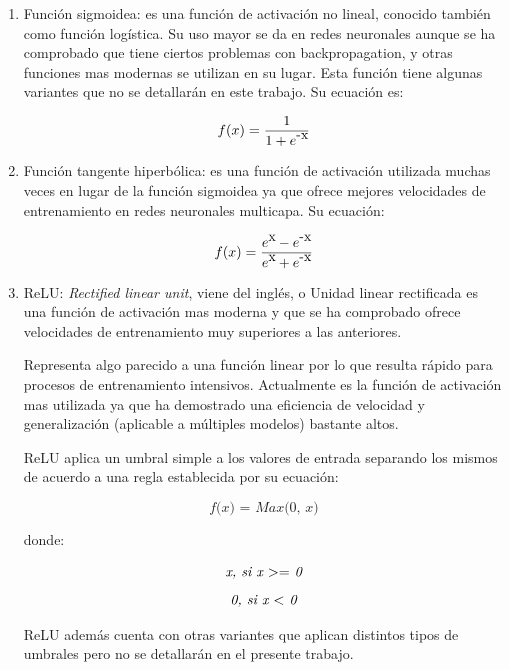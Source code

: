\documentclass[a4paper,12pt,oneside,spanish]{book}
\begin{document}
\begin{enumerate}
	\baselineskip 16pt
	\item Función sigmoidea: es una función de activación no lineal, conocido también como función logística. Su uso mayor se da en redes neuronales aunque se ha comprobado que tiene ciertos problemas con backpropagation, y otras funciones mas modernas se utilizan en su lugar. Esta función tiene algunas variantes que no se detallarán en este trabajo. Su ecuación es:\par 
	
	\begin{equation}
	f(x) = \frac{1}{1 + e\raisebox{1ex}{-x}} 
	\end{equation}

	\item Función tangente hiperbólica: es una función de activación utilizada muchas veces en lugar de la función sigmoidea ya que ofrece mejores velocidades de entrenamiento en redes neuronales multicapa. Su ecuación:\par 

	\begin{equation}
	f(x) = \frac{e\raisebox{1ex}{x} - e\raisebox{1ex}{-x}}{e\raisebox{1ex}{x} + e\raisebox{1ex}{-x}} 
	\end{equation}

	\item ReLU: \textit{Rectified linear unit}, viene del inglés, o Unidad linear rectificada es una función de activación mas moderna y que se ha comprobado ofrece velocidades de entrenamiento muy superiores a las anteriores. \par 
	Representa algo parecido a una función linear por lo que resulta rápido para procesos de entrenamiento intensivos. Actualmente es la función de activación mas utilizada ya que ha demostrado una eficiencia de velocidad y  generalización (aplicable a múltiples modelos) bastante altos.\par 
	
	ReLU aplica un umbral simple a los valores de entrada separando los mismos de acuerdo a una regla establecida por su ecuación:\par 

	\[ \textit{f(x) = Max(0, x)} \]
	
	donde:
	
	\[ \textit{x, si x $ >= $ 0} \]
	\[ \textit{0, si x $ < $ 0} \]

	ReLU además cuenta con otras variantes que aplican distintos tipos de umbrales pero no se detallarán en el presente trabajo.\par 
\end{enumerate}	\baselineskip 16pt
\end{document}
